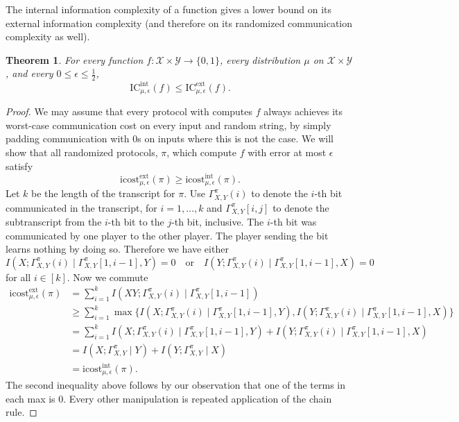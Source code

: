 \documentclass[11pt]{amsart}
\theoremstyle{plain}
\newtheorem{theorem}{Theorem}
\theoremstyle{definition}
\theoremstyle{plain}
\newcommand{\calX}{\mathcal{X}}
\newcommand{\calY}{\mathcal{Y}}
\newcommand{\ICext}{\mathrm{IC}^{\mathrm{ext}}}
\newcommand{\ICint}{\mathrm{IC}^{\mathrm{int}}}
\newcommand{\icostext}{\mathrm{icost}^{\mathrm{ext}}}
\newcommand{\icostint}{\mathrm{icost}^{\mathrm{int}}}
\begin{document}
The internal information complexity of a function gives a lower bound on its external information complexity (and therefore on its randomized communication complexity as well).

\begin{theorem}\label{th:6}
For every function $f : \calX \times \calY \to \{0,1\}$, every distribution $\mu$ on $\calX \times \calY$, and every $0 \le \epsilon \le \frac12$,
\[
\ICint_{\mu,\epsilon}(f) \le \ICext_{\mu,\epsilon}(f).
\]
\end{theorem}

\begin{proof}
We may assume that every protocol with computes $f$ always achieves its worst-case communication cost on every input and random string, by simply padding communication with $0$s on inputs where this is not the case. We will show that all randomized protocols, $\pi$, which compute $f$ with error at most $\epsilon$ satisfy
$$\icostext_{\mu,\epsilon}(\pi) \geq \icostint_{\mu,\epsilon}(\pi).$$
Let $k$ be the length of the transcript for $\pi$. Use $\Gamma^\pi_{X,Y}(i)$ to denote the $i$-th bit communicated in the transcript, for $i=1,\dots, k$ and $\Gamma^\pi_{X,Y}[i,j]$ to denote the subtranscript from the $i$-th bit to the $j$-th bit, inclusive. The $i$-th bit was communicated by one player to the other player. The player sending the bit learns nothing by doing so. Therefore we have either
$$I(X;\Gamma^\pi_{X,Y}(i) \mid \Gamma^{\pi}_{X,Y}[1,i-1], Y) = 0 \quad\text{or}\quad I(Y;\Gamma^\pi_{X,Y}(i) \mid \Gamma^{\pi}_{X,Y}[1,i-1], X) = 0 $$
for all $i\in[k]$.
Now we commute
\begin{align*}
\icostext_{\mu,\epsilon}(\pi) &= \sum_{i=1}^k I(XY;\Gamma^\pi_{X,Y}(i) \mid \Gamma^\pi_{X,Y}[1,i-1]) \\
&\geq \sum_{i=1}^k\max\{I(X;\Gamma^\pi_{X,Y}(i) \mid \Gamma^{\pi}_{X,Y}[1,i-1], Y), I(Y;\Gamma^\pi_{X,Y}(i) \mid \Gamma^{\pi}_{X,Y}[1,i-1], X)\}\\
&=\sum_{i=1}^k I(X;\Gamma^\pi_{X,Y}(i) \mid \Gamma^{\pi}_{X,Y}[1,i-1], Y)+ I(Y;\Gamma^\pi_{X,Y}(i) \mid \Gamma^{\pi}_{X,Y}[1,i-1], X) \\
&= I(X;\Gamma^\pi_{X,Y} \mid Y) + I(Y; \Gamma^\pi_{X,Y} \mid X) \\
&= \icostint_{\mu,\epsilon}(\pi).
\end{align*}
The second inequality above follows by our observation that one of the terms in each max is $0$. Every other manipulation is repeated application of the chain rule.
\end{proof}
\end{document}

